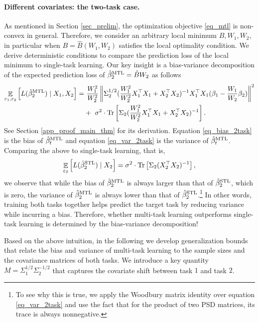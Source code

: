 \paragraph{Different covariates: the two-task case.}
As mentioned in Section \ref{sec_prelim}, the optimization objective \eqref{eq_mtl} is non-convex in general.
Therefore, we consider an arbitrary local minimum $B, W_1, W_2$, in particular when $B = \hat{B}(W_1, W_2)$ satisfies the local optimality condition.
We derive deterministic conditions to compare the prediction loss of the local minimum to single-task learning.
Our key insight is a bias-variance decomposition of the expected prediction loss of $\hat{\beta}_2^{\textup{MTL}} = \hat{B} W_2$ as follows
\begin{align}
	\mathop{\mathbb{E}}_{\varepsilon_1, \varepsilon_2}\left[ L(\hat{\beta}_2^{\textup{MTL}}) \mid X_1, X_2 \right]
	=&~ \frac{W_1^2}{W_2^2} \left\| \Sigma_2^{1/2}(\frac{W_1^2}{W_2^2} X_1^{\top}X_1 + X_2^{\top}X_2)^{-1} X_1^{\top}X_1 (\beta_1 - \frac{W_1}{W_2} \beta_2) \right\|^2 \label{eq_bias_2task} \\
			&+~  \sigma^2\cdot \operatorname{Tr}\left[\Sigma_2(\frac{W_1^2}{W_2^2} X_1^{\top}X_1 + X_2^{\top}X_2)^{-1} \right]. \label{eq_var_2task}
\end{align}
See Section \ref{app_proof_main_thm} for its derivation.
Equation \eqref{eq_bias_2task} is the bias of $\hat{\beta}_t^{\textup{MTL}}$ and
equation \eqref{eq_var_2task} is the variance of $\hat{\beta}_t^{\textup{MTL}}$.
Comparing the above to single-task learning, that is,
\begin{align}
	\mathop{\mathbb{E}}_{\varepsilon_2}\left[ L(\hat{\beta}_2^{\textup{STL}}) \mid X_2 \right] = \sigma^2 \cdot \operatorname{Tr}\left[\Sigma_2 (X_2^{\top} X_2)^{-1}\right], \label{eq_var_stl}
\end{align}
we observe that while the bias of $\hat{\beta}_2^{\textup{MTL}}$ is always larger than that of $\hat{\beta}_2^{\textup{STL}}$, which is zero, the variance of $\hat{\beta}_2^{\textup{MTL}}$ is always lower than that of $\hat{\beta}_2^{\textup{STL}}$.\footnote{To see why this is true, we apply the Woodbury matrix identity over equation \eqref{eq_var_2task} and use the fact that for the product of two PSD matrices, its trace is always nonnegative.}
In other words, training both tasks together helps predict the target task by reducing variance while incurring a bias.
Therefore, whether multi-task learning outperforms single-task learning is determined by the bias-variance decomposition!


Based on the above intuition, in the following we develop generalization bounds that relate the bias and variance of multi-task learning to the sample sizes and the covariance matrices of both tasks.
We introduce a key quantity $M = \Sigma_1^{1/2}\Sigma_2^{-1/2}$ that captures the covariate shift between task $1$ and task $2$.

